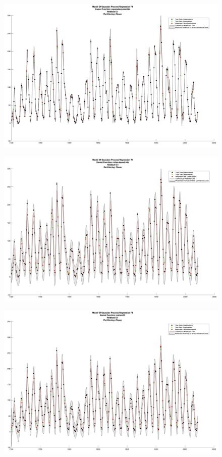 \documentclass[12pt,a4paper]{article}
\begin{document}
\begin{figure}[H]
	\centering
	\includegraphics[scale = 0.2]{Squared_Exponential.jpg}
\end{figure}

\newpage

\begin{figure}[H]
	\centering
	\includegraphics[scale = 0.2]{Rational_Quadratic.jpg}
\end{figure}

\vspace{3cm}

\begin{figure}[H]
	\centering
	\includegraphics[scale = 0.2]{Matern32.jpg}
\end{figure}
\end{document}
